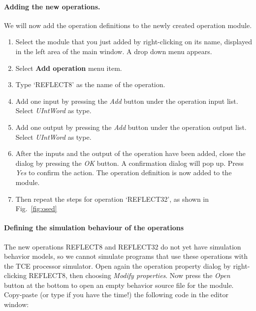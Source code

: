 \documentclass[twoside]{tceusermanual}
\begin{document}
\paragraph{Adding the new operations.} We will now add the operation
definitions to the newly created operation module.

\begin{enumerate}
\item%
  Select the module that you just added by right-clicking on its name,
  displayed in the left area of the main window. A drop down menu appears.
\item%
  Select \textbf{Add operation} menu item.
\item%
  Type `REFLECT8' as the name of the operation.
\item%
  Add one input by pressing the \emph{Add} button under the operation input
  list. Select \textit{UIntWord} as type.
\item%
  Add one output by pressing the \emph{Add} button under the operation output
  list. Select \textit{UIntWord} as type.
\item%
  After the inputs and the output of the operation have been added, close
  the dialog by pressing the \emph{OK} button. A confirmation dialog will pop
  up. Press \emph{Yes} to confirm the action. The operation definition is
  now added to the module.
\item%
  Then repeat the steps for operation `REFLECT32', as shown in Fig.~\ref{fig:osed}
\end{enumerate}

\paragraph{Defining the simulation behaviour of the operations} The new operations
REFLECT8 and REFLECT32 do not yet have simulation behavior models, so
we cannot simulate programs that use these operations with the TCE
processor simulator. Open again the operation property dialog by
right-clicking REFLECT8, then choosing \emph{Modify properties}. Now
press the \emph{Open} button at the bottom to open an empty behavior
source file for the module. Copy-paste (or type if you have the time!) 
the following code in the editor window:
\end{document}
